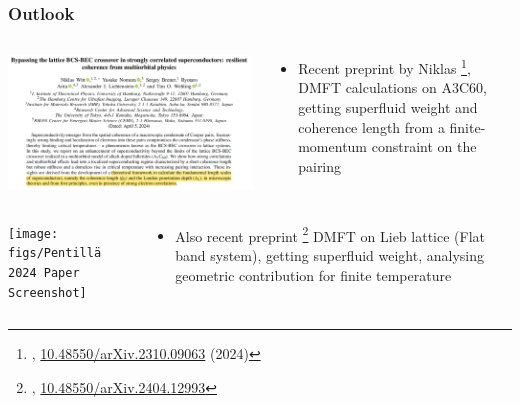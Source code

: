 \documentclass[aspectratio=169]{beamer}
\begin{document}
\begin{frame}
	\frametitle{Outlook}
	
	\begin{columns}[T]
		\begin{column}{0.5\textwidth}
			\begin{center}
				\includegraphics[width=\textwidth]{figs/Witt 2024 Paper Screenshot}
				
			\end{center}
		\end{column}
		\begin{column}{0.5\textwidth}
			\begin{itemize}
				\item Recent preprint by Niklas \footnote[frame]{\citeauthor{wittBypassingLatticeBCSBEC2024}, \href{https://doi.org/10.48550/arXiv.2310.09063}{10.48550/arXiv.2310.09063} (2024)}, DMFT calculations on A3C60, getting superfluid weight and coherence length from a finite-momentum constraint on the pairing
			\end{itemize}
		\end{column}
	\end{columns}
\end{frame}

\begin{frame}
	\begin{columns}[T]
		\begin{column}{0.5\textwidth}
			\begin{center}
				\texttt{[image: figs/Pentillä 2024 Paper Screenshot]}
				
			\end{center}
		\end{column}
		\begin{column}{0.5\textwidth}
			\begin{itemize}
				\item Also recent preprint \footnote[frame]{\citeauthor{penttilaFlatbandRatioQuantum2024}, \href{htts://doi.org/10.48550/arXiv.2404.12993}{10.48550/arXiv.2404.12993}} DMFT on Lieb lattice (Flat band system), getting superfluid weight, analysing geometric contribution for finite temperature
			\end{itemize}
		\end{column}
	\end{columns}
\end{frame}
\end{document}
